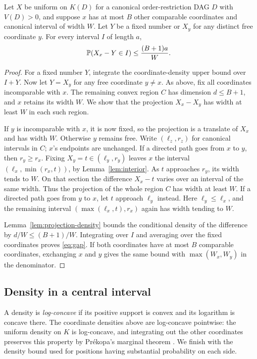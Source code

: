 \begin{lemma}\label{lem:gap}
Let $X$ be uniform on $K(D)$ for a canonical order-restriction DAG
$D$ with $V(D)>0$, and suppose $x$ has
at most $B$ other comparable coordinates and canonical interval of width
$W$. Let $Y$ be a fixed number or $X_y$ for any distinct free coordinate
$y$. For every interval $I$ of length $a$,
\begin{equation}\label{eq:gap}
\mathbb P(X_x-Y\in I)\le\frac{(B+1)a}{W}.
\end{equation}
\end{lemma}
\begin{proof}
For a fixed number $Y$, integrate the coordinate-density upper bound
over $I+Y$. Now let $Y=X_y$ for any free coordinate $y\ne x$.
As above, fix all coordinates incomparable with $x$. The remaining
convex region $C$ has dimension $d\le B+1$, and $x$ retains its
width $W$. We show that the projection $X_x-X_y$ has width
at least $W$ in each such region.

If $y$ is incomparable with $x$, it is now fixed, so the projection is
a translate of $X_x$ and has width $W$. Otherwise $y$ remains free.
Write $(\ell_z,r_z)$ for canonical intervals in $C$; $x$'s endpoints
are unchanged. If a directed path goes from $x$ to $y$, then $r_y\ge r_x$.
Fixing $X_y=t\in(\ell_y,r_y)$ leaves $x$ the interval
$(\ell_x,\min(r_x,t))$, by Lemma~\ref{lem:interior}. As $t$ approaches
$r_y$, its width tends to $W$. On that section the difference
$X_x-t$ varies over an interval of the same width. Thus the projection
of the whole region $C$ has width at least $W$.
If a directed path goes from $y$ to $x$, let $t$ approach $\ell_y$ instead.
Here $\ell_y\le\ell_x$, and the remaining interval
$(\max(\ell_x,t),r_x)$ again has width tending to $W$.

Lemma~\ref{lem:projection-density} bounds the conditional density of the
difference by $d/W\le(B+1)/W$. Integrating over $I$ and averaging over
the fixed coordinates proves \eqref{eq:gap}. If both coordinates have
at most $B$ comparable coordinates, exchanging $x$ and $y$ gives the
same bound with $\max(W_x,W_y)$ in the denominator.
\end{proof}

\subsection{Density in a central interval}

A density is \emph{log-concave} if its positive support is convex and its
logarithm is concave there. The coordinate densities above are log-concave pointwise: the uniform
density on $K$ is log-concave, and integrating out the other coordinates
preserves this property by Pr\'ekopa's marginal theorem
\cite[Theorem~8]{prekopa}. We finish with the density bound used for
positions having substantial probability on each side.

